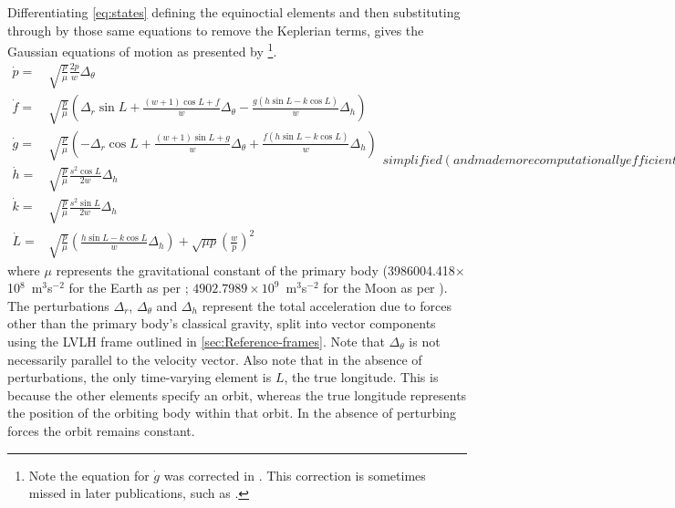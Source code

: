 Differentiating \autoref{eq:states} defining the equinoctial elements and then substituting through by those same equations to remove the Keplerian terms, gives the Gaussian equations of motion as presented by \cite{Walker1985,Walker1986,Keppeler_thesis,Erb_thesis,Letterio_thesis,Hintz2008} \footnote{Note the equation for $\dot{g}$ was corrected in \textcite{Walker1986}. This correction is sometimes missed in later publications, such as \textcite{Hintz2008}.}.
\begin{subequations}\label{eq:state-updates}
\begin{eqnarray}
\dot{p} = & \sqrt{\frac{p}{\mu}}\frac{2p}{w}\Delta_\theta \label{eq:pdot}\\
\dot{f} = & \sqrt{\frac{p}{\mu}}\left(\Delta_r\sin L+\frac{\left(w+1\right)\cos L+f}{w}\Delta_\theta-\frac{g\left(h\sin L-k\cos L\right)}{w}\Delta_h \right) \label{eq:fdot}\\
\dot{g} = & \sqrt{\frac{p}{\mu}}\left(-\Delta_r\cos L+\frac{\left(w+1\right)\sin L+g}{w}\Delta_\theta+\frac{f\left(h\sin L-k\cos L\right)}{w}\Delta_h \right) \label{eq:gdot}\\
\dot{h} = & \sqrt{\frac{p}{\mu}}\frac{s^{2}\cos L}{2w}\Delta_h \label{eq:hdot}\\
\dot{k} = & \sqrt{\frac{p}{\mu}}\frac{s^{2}\sin L}{2w}\Delta_h \label{eq:kdot}\\
\dot{L} = & \sqrt{\frac{p}{\mu}}\left(\frac{h\sin L-k\cos L}{w}\Delta_h \right)+\sqrt{\mu p}\left(\frac{w}{p}\right)^{2} \label{eq:Ldot}
\end{eqnarray}
simplified (and made more computationally efficient) using the terms
\begin{eqnarray}
w & = & 1+f\cos L+g\sin L\label{eq:w_helper}\\
s^{2} & = & 1+h^{2}+k^{2}\label{eq:s2_helper}
\end{eqnarray}
\end{subequations}
where $\mu$ represents the gravitational constant of the primary body \linebreak (3986004.418$\times$10$^8$~m$^3$s$^{-2}$ for the Earth as per \cite{WGS84}; $4902.7989\times10^9$~m$^3$s$^{-2}$ for the Moon as per \cite{Zhang1994}). The perturbations $\Delta_r$, $\Delta_\theta$ and $\Delta_h$ represent the total acceleration due to forces other than the primary body's classical gravity, split into vector components using the LVLH frame outlined in \autoref{sec:Reference-frames}. Note that $\Delta_\theta$ is not necessarily parallel to the velocity vector. Also note that in the absence of perturbations, the only time-varying element is $L$, the true longitude. This is because the other elements specify an orbit, whereas the true longitude represents the position of the orbiting body within that orbit. In the absence of perturbing forces the orbit remains constant.




